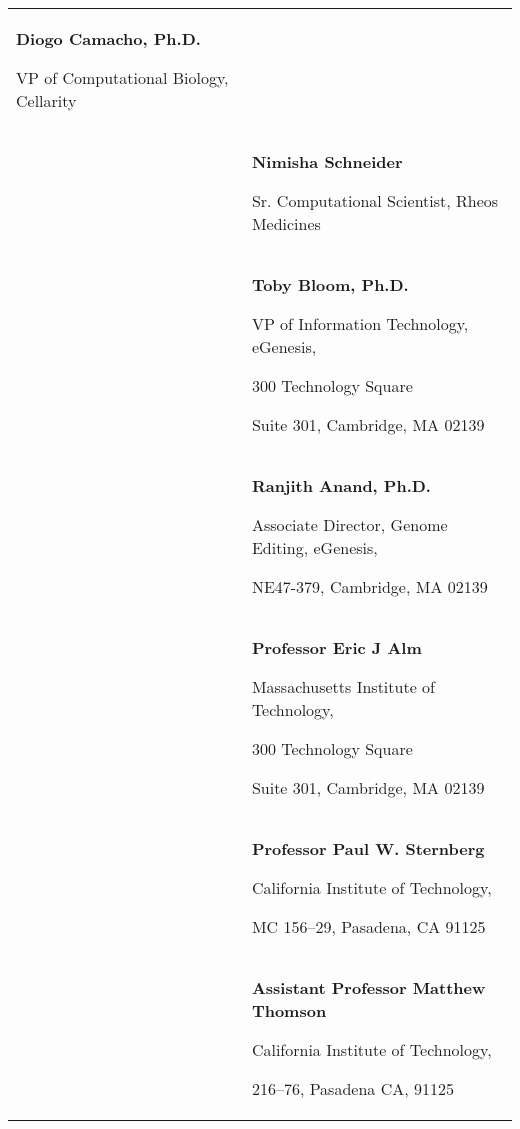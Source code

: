 \newpage
{}

\begin{tabularx}{\textwidth}{@{}X X@{}}
  \textbf{Diogo Camacho, Ph.D.}\par
    VP of Computational Biology, Cellarity\\

  &

  \textbf{Nimisha Schneider}\par
    Sr. Computational Scientist, Rheos Medicines\\

  &

  \textbf{Toby Bloom, Ph.D.}\par
    VP of Information Technology, eGenesis,\par
    300 Technology Square\par
    Suite 301, Cambridge, MA 02139\par
    \makefield{\faEnvelopeO}{\url{tbloom@alum.mit.edu}}\\

  &

  \textbf{Ranjith Anand, Ph.D.}\par
    Associate Director, Genome Editing, eGenesis,\par
    NE47-379, Cambridge, MA 02139\par
    \makefield{\faEnvelopeO}{\url{rapanand@gmail.com}}\\

  &

  \textbf{Professor Eric J Alm}\par
    Massachusetts Institute of Technology,\par
    300 Technology Square\par
    Suite 301, Cambridge, MA 02139\par
    \makefield{\faEnvelopeO}{\url{burnss@mit.edu}}\\

  &

  \textbf{Professor Paul W. Sternberg}\par
    California Institute of Technology,\par
    MC 156--29, Pasadena, CA 91125\par
    \makefield{\faEnvelopeO}{\url{pws@caltech.edu}}\\

  &

  \textbf{Assistant Professor Matthew Thomson}\par
    California Institute of Technology,\par
    216--76, Pasadena CA, 91125\par
    \makefield{\faEnvelopeO}{\url{mthomson@caltech.edu}}\\
\end{tabularx}

